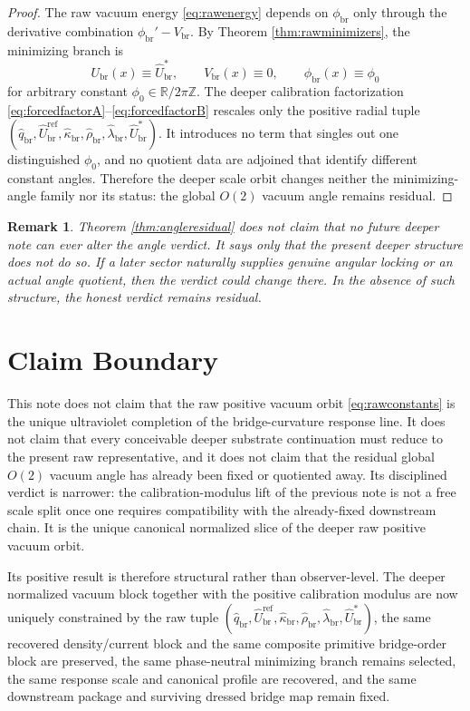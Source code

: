 \documentclass[11pt]{article}
\newcommand{\RespVacAmp}{U_{\mathrm{br}}}
\newcommand{\RespVacPhase}{\phi_{\mathrm{br}}}
\newcommand{\RespVacCarrier}{V_{\mathrm{br}}}
\newcommand{\RespRawReadout}{\widehat q_{\mathrm{br}}}
\newcommand{\RespRawRef}{\widehat U_{\mathrm{br}}^{\mathrm{ref}}}
\newcommand{\RespRawCov}{\widehat\kappa_{\mathrm{br}}}
\newcommand{\RespRawRelax}{\widehat\rho_{\mathrm{br}}}
\newcommand{\RespRawWell}{\widehat\lambda_{\mathrm{br}}}
\newcommand{\RespRawEq}{\widehat U_{\mathrm{br}}^{\ast}}
\newtheorem{remark}{Remark}
\begin{document}
\begin{proof}
The raw vacuum energy \eqref{eq:rawenergy} depends on \(\RespVacPhase\) only through the derivative combination \(\RespVacPhase'-\RespVacCarrier\). By Theorem \ref{thm:rawminimizers}, the minimizing branch is
\[
\RespVacAmp(x)\equiv\RespRawEq,
\qquad
\RespVacCarrier(x)\equiv0,
\qquad
\RespVacPhase(x)\equiv\phi_0
\]
for arbitrary constant \(\phi_0\in\mathbb R/2\pi\mathbb Z\). The deeper calibration factorization \eqref{eq:forcedfactorA}--\eqref{eq:forcedfactorB} rescales only the positive radial tuple \((\RespRawReadout,\RespRawRef,\RespRawCov,\RespRawRelax,\RespRawWell,\RespRawEq)\). It introduces no term that singles out one distinguished \(\phi_0\), and no quotient data are adjoined that identify different constant angles. Therefore the deeper scale orbit changes neither the minimizing-angle family nor its status: the global \(O(2)\) vacuum angle remains residual.
\end{proof}

\begin{remark}
Theorem \ref{thm:angleresidual} does not claim that no future deeper note can ever alter the angle verdict. It says only that the present deeper structure does not do so. If a later sector naturally supplies genuine angular locking or an actual angle quotient, then the verdict could change there. In the absence of such structure, the honest verdict remains residual.
\end{remark}

\section{Claim Boundary}

This note does not claim that the raw positive vacuum orbit \eqref{eq:rawconstants} is the unique ultraviolet completion of the bridge-curvature response line. It does not claim that every conceivable deeper substrate continuation must reduce to the present raw representative, and it does not claim that the residual global \(O(2)\) vacuum angle has already been fixed or quotiented away. Its disciplined verdict is narrower: the calibration-modulus lift of the previous note is not a free scale split once one requires compatibility with the already-fixed downstream chain. It is the unique canonical normalized slice of the deeper raw positive vacuum orbit.

Its positive result is therefore structural rather than observer-level. The deeper normalized vacuum block together with the positive calibration modulus are now uniquely constrained by the raw tuple \((\RespRawReadout,\RespRawRef,\RespRawCov,\RespRawRelax,\RespRawWell,\RespRawEq)\), the same recovered density/current block and the same composite primitive bridge-order block are preserved, the same phase-neutral minimizing branch remains selected, the same response scale and canonical profile are recovered, and the same downstream package and surviving dressed bridge map remain fixed.
\end{document}
